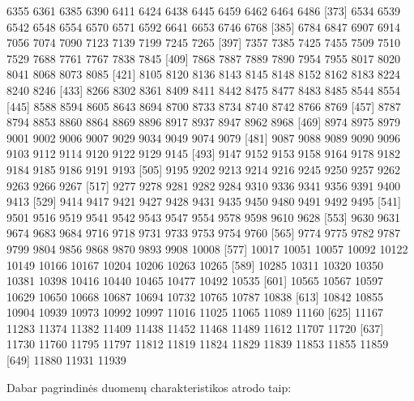 \documentclass[a4paper]{article}
\begin{document}
\begin{Schunk}
\begin{Soutput}
[361]  6355  6361  6385  6390  6411  6424  6438  6445  6459  6462  6464  6486
[373]  6534  6539  6542  6548  6554  6570  6571  6592  6641  6653  6746  6768
[385]  6784  6847  6907  6914  7056  7074  7090  7123  7139  7199  7245  7265
[397]  7357  7385  7425  7455  7509  7510  7529  7688  7761  7767  7838  7845
[409]  7868  7887  7889  7890  7954  7955  8017  8020  8041  8068  8073  8085
[421]  8105  8120  8136  8143  8145  8148  8152  8162  8183  8224  8240  8246
[433]  8266  8302  8361  8409  8411  8442  8475  8477  8483  8485  8544  8554
[445]  8588  8594  8605  8643  8694  8700  8733  8734  8740  8742  8766  8769
[457]  8787  8794  8853  8860  8864  8869  8896  8917  8937  8947  8962  8968
[469]  8974  8975  8979  9001  9002  9006  9007  9029  9034  9049  9074  9079
[481]  9087  9088  9089  9090  9096  9103  9112  9114  9120  9122  9129  9145
[493]  9147  9152  9153  9158  9164  9178  9182  9184  9185  9186  9191  9193
[505]  9195  9202  9213  9214  9216  9245  9250  9257  9262  9263  9266  9267
[517]  9277  9278  9281  9282  9284  9310  9336  9341  9356  9391  9400  9413
[529]  9414  9417  9421  9427  9428  9431  9435  9450  9480  9491  9492  9495
[541]  9501  9516  9519  9541  9542  9543  9547  9554  9578  9598  9610  9628
[553]  9630  9631  9674  9683  9684  9716  9718  9731  9733  9753  9754  9760
[565]  9774  9775  9782  9787  9799  9804  9856  9868  9870  9893  9908 10008
[577] 10017 10051 10057 10092 10122 10149 10166 10167 10204 10206 10263 10265
[589] 10285 10311 10320 10350 10381 10398 10416 10440 10465 10477 10492 10535
[601] 10565 10567 10597 10629 10650 10668 10687 10694 10732 10765 10787 10838
[613] 10842 10855 10904 10939 10973 10992 10997 11016 11025 11065 11089 11160
[625] 11167 11283 11374 11382 11409 11438 11452 11468 11489 11612 11707 11720
[637] 11730 11760 11795 11797 11812 11819 11824 11829 11839 11853 11855 11859
[649] 11880 11931 11939
\end{Soutput}
\end{Schunk}
Dabar pagrindinės duomenų charakteristikos atrodo taip:
\end{document}
